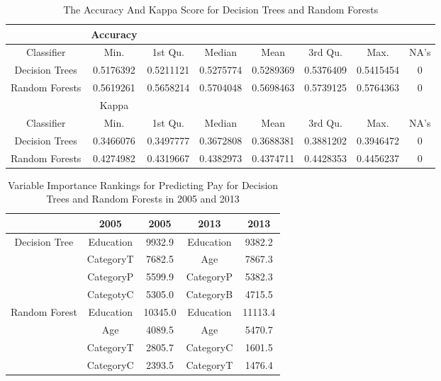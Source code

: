 \documentclass{article}
\begin{document}
    \begin{center}
        \begin{table}
            \centering
            \begin{tabular}{ |c|c|c|c|c|c|c|c| }
                \hline
                & Accuracy \\
                \hline
                Classifier & Min. & 1st Qu. & Median & Mean & 3rd Qu. & Max. & NA's \\
                Decision Trees & 0.5176392 & 0.5211121 & 0.5275774 & 0.5289369 & 0.5376409 & 0.5415454 & 0 \\
                Random Forests & 0.5619261 & 0.5658214 & 0.5704048 & 0.5698463 & 0.5739125 & 0.5764363 & 0 \\
                \hline
                & Kappa \\
                \hline
                Classifier & Min. & 1st Qu. & Median & Mean & 3rd Qu. & Max. & NA's \\
                Decision Trees & 0.3466076 & 0.3497777 & 0.3672808 & 0.3688381 & 0.3881202 & 0.3946472 & 0 \\
                Random Forests & 0.4274982 & 0.4319667 & 0.4382973 & 0.4374711 & 0.4428353 & 0.4456237 & 0 \\
                \hline
            \end{tabular}
            \caption{The Accuracy And Kappa Score for Decision Trees and Random Forests}
            \label{tab:7}
        \end{table}
    \end{center}

    \begin{center}
        \begin{table}
            \centering
            \begin{tabular}{ |c|c|c|c|c| }
                \hline
                & 2005 & 2005 & 2013 & 2013 \\
                \hline
                Decision Tree & Education & 9932.9 & Education & 9382.2 \\
                & CategoryT & 7682.5 & Age & 7867.3 \\
                & CategoryP & 5599.9 & CategoryP & 5382.3 \\
                & CategotyC & 5305.0 & CategoryB & 4715.5 \\
                \hline
                Random Forest & Education & 10345.0 & Education & 11113.4 \\
                & Age & 4089.5 & Age & 5470.7 \\
                & CategoryT & 2805.7 & CategoryC & 1601.5 \\
                & CategoryC & 2393.5 & CategoryT & 1476.4 \\
                \hline
            \end{tabular}
            \caption{Variable Importance Rankings for Predicting Pay for Decision Trees and Random Forests in 2005 and 2013}
            \label{tab:8}
        \end{table}
    \end{center}
\end{document}
